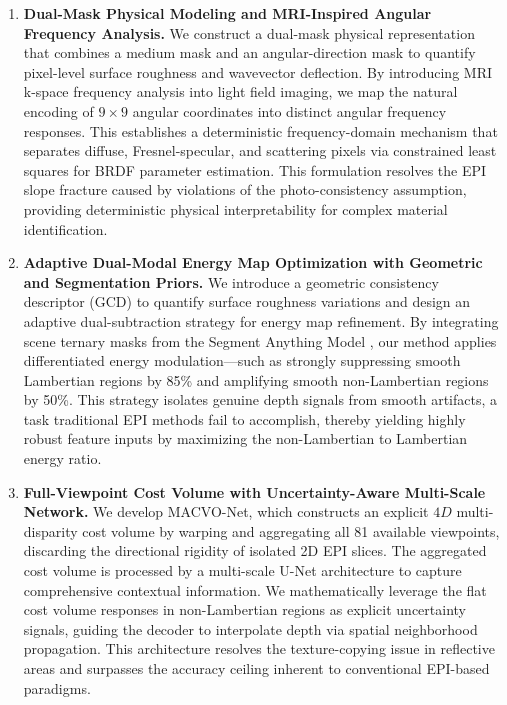 \documentclass[lettersize,journal]{IEEEtran}
\begin{document}
\begin{enumerate}
    \item \textbf{Dual-Mask Physical Modeling and MRI-Inspired Angular Frequency Analysis.} We construct a dual-mask physical representation that combines a medium mask and an angular-direction mask to quantify pixel-level surface roughness and wavevector deflection. By introducing MRI k-space frequency analysis into light field imaging, we map the natural encoding of $9\times 9$ angular coordinates into distinct angular frequency responses. This establishes a deterministic frequency-domain mechanism that separates diffuse, Fresnel-specular, and scattering pixels via constrained least squares for BRDF parameter estimation. This formulation resolves the EPI slope fracture caused by violations of the photo-consistency assumption, providing deterministic physical interpretability for complex material identification. 
    
    \item \textbf{Adaptive Dual-Modal Energy Map Optimization with Geometric and Segmentation Priors.} We introduce a geometric consistency descriptor (GCD) to quantify surface roughness variations and design an adaptive dual-subtraction strategy for energy map refinement. By integrating scene ternary masks from the Segment Anything Model \cite{kirillov2023}, our method applies differentiated energy modulation—such as strongly suppressing smooth Lambertian regions by 85\% and amplifying smooth non-Lambertian regions by 50\%. This strategy isolates genuine depth signals from smooth artifacts, a task traditional EPI methods fail to accomplish, thereby yielding highly robust feature inputs by maximizing the non-Lambertian to Lambertian energy ratio.
    
    \item \textbf{Full-Viewpoint Cost Volume with Uncertainty-Aware Multi-Scale Network.} We develop MACVO-Net, which constructs an explicit $4D$ multi-disparity cost volume by warping and aggregating all 81 available viewpoints, discarding the directional rigidity of isolated 2D EPI slices. The aggregated cost volume is processed by a multi-scale U-Net \cite{ronneberger2015} architecture to capture comprehensive contextual information. We mathematically leverage the flat cost volume responses in non-Lambertian regions as explicit uncertainty signals, guiding the decoder to interpolate depth via spatial neighborhood propagation. This architecture resolves the texture-copying issue in reflective areas and surpasses the accuracy ceiling inherent to conventional EPI-based paradigms.
\end{enumerate}
\end{document}
